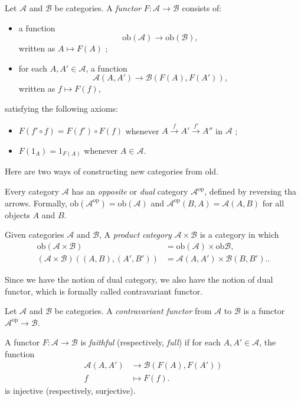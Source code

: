 \begin{definition}
  Let $\mathscr{A}$ and $\mathscr{B}$ be categories. A \textit{functor} $F:\mathscr{A}\to \mathscr{B}$ consists of:
  \begin{itemize}
    \item a function 
      \[
	\mathrm{ob}(\mathscr{A})\to \mathrm{ob}(\mathscr{B}),
      \] written as $A\mapsto F(A)$ ;
    \item for each $A,A' \in \mathscr{A}$, a function
      \[
	\mathscr{A}(A,A')\to \mathscr{B}(F(A),F(A')),
      \] written as $f\mapsto F(f)$,
  \end{itemize}
  satisfying the following axioms:
  \begin{itemize}
    \item $F(f'\circ f)=F(f')\circ F(f)$ whenever $A\xrightarrow{f}A'\xrightarrow{f'}A''$ in $\mathscr{A}$ ;
    \item $F(1_{A})=1_{F(A)}$ whenever $A\in \mathscr{A}$.
  \end{itemize}
\end{definition}

Here are two ways of constructing new categories from old.
\begin{definition}
  Every category $\mathscr{A}$ has an \textit{opposite} or \textit{dual} category $\mathscr{A}^{\mathrm{op}}$, defined by reversing tha arrows. Formally, $\mathrm{ob}(\mathscr{A}^{\mathrm{op}})=\mathrm{ob}(\mathscr{A})$ and $\mathscr{A}^{\mathrm{op}}(B,A)=\mathscr{A}(A,B)$ for all objects $A$ and $B$.
\end{definition}

\begin{definition}
  Given categories $\mathscr{A}$ and $\mathscr{B}$, A \textit{product category} $\mathscr{A}\times \mathscr{B}$ is a category in which
  \begin{align*}
    \mathrm{ob}(\mathscr{A}\times \mathscr{B})&=\mathrm{ob}(\mathscr{A})\times \mathrm{ob}\mathscr{B},\\
    \left( \mathscr{A}\times \mathscr{B} \right) \left( (A,B),(A',B') \right) &=\mathscr{A}(A,A')\times \mathscr{B}(B,B').
  .\end{align*}
\end{definition}

Since we have the notion of dual category, we also have the notion of dual functor, which is formally called contravariant functor.
\begin{definition}
  Let $\mathscr{A}$ and $\mathscr{B}$ be categories. A \textit{contravariant functor} from $\mathscr{A}$ to $\mathscr{B}$ is a functor $\mathscr{A}^{\mathrm{op}}\to \mathscr{B}$.
\end{definition}
\begin{definition}
  A functor $F:\mathscr{A}\to \mathscr{B}$ is \textit{faithful} (respectively, \textit{full}) if for each $A,A' \in \mathscr{A}$, the function
  \begin{align*}
    \mathscr{A}(A,A')  &\longrightarrow \mathscr{B}(F(A),F(A')) \\
    f &\longmapsto F(f)
   .\end{align*}
  is injective (respectively, surjective).
\end{definition}

